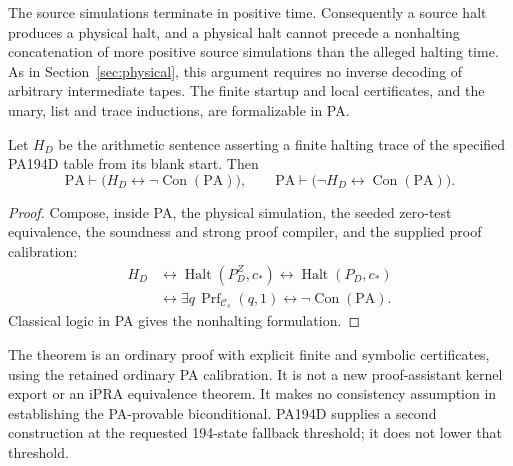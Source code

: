 The source simulations terminate in positive time.  Consequently a
source halt produces a physical halt, and a physical halt cannot
precede a nonhalting concatenation of more positive source simulations
than the alleged halting time.  As in Section~\ref{sec:physical}, this
argument requires no inverse decoding of arbitrary intermediate tapes.
The finite startup and local certificates, and the unary, list and
trace inductions, are formalizable in PA.

\begin{theorem}
Let \(H_D\) be the arithmetic sentence asserting a finite halting
trace of the specified PA194D table from its blank start.  Then
\[
 \mathrm{PA}\vdash
    \bigl(H_D\leftrightarrow\neg\operatorname{Con}(\mathrm{PA})\bigr),
 \qquad
 \mathrm{PA}\vdash
    \bigl(\neg H_D\leftrightarrow\operatorname{Con}(\mathrm{PA})\bigr).
\]
\end{theorem}
\begin{proof}
Compose, inside PA, the physical simulation, the seeded zero-test
equivalence, the soundness and strong proof compiler, and the supplied
proof calibration:
\[
\begin{split}
 H_D
 &\longleftrightarrow\operatorname{Halt}(P_D^Z,c_*)
 \longleftrightarrow\operatorname{Halt}(P_D,c_*)\\
 &\longleftrightarrow
       \exists q\,\operatorname{Prf}_{\mathcal C_s}(q,1)
 \longleftrightarrow\neg\operatorname{Con}(\mathrm{PA}).
\end{split}
\]
Classical logic in PA gives the nonhalting formulation.
\end{proof}

The theorem is an ordinary proof with explicit finite and symbolic
certificates, using the retained ordinary PA calibration.  It is not
a new proof-assistant kernel export or an iPRA equivalence theorem.
It makes no consistency assumption in establishing the PA-provable
biconditional.  PA194D supplies a second construction at the requested
194-state fallback threshold; it does not lower that threshold.
